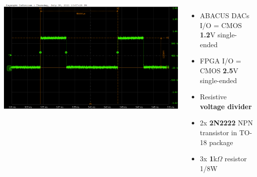 \documentclass[aspectratio=169]{beamer}
\begin{document}
\begin{frame}
\begin{columns}
\begin{center}
			\includegraphics[width=0.5 \textwidth]{IMG/probe/09-08-2021_clock-specks.png}
		\end{center}
		\begin{itemize}
			\item ABACUS DACs I/O = CMOS \textbf{1.2}V single-ended
			\item FPGA I/O = CMOS \textbf{2.5}V single-ended
			\item Resistive \textbf{voltage divider}
			\item 2x \textbf{2N2222} NPN transistor in TO-18 package
			\item 3x \textbf{1}k$\Omega$ resistor 1/8W
		\end{itemize}
	\end{columns}
	\end{frame}
\end{document}
